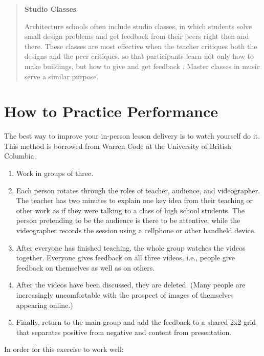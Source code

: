\begin{quote}\setlength{\parindent}{0pt}
\textbf{Studio Classes}

Architecture schools often include studio classes, in which students
solve small design problems and get feedback from their peers right
then and there. These classes are most effective when the teacher
critiques both the designs and the peer critiques, so that
participants learn not only how to make buildings, but how to give and
get feedback \cite{Scho1984}. Master classes in music serve a
similar purpose.
\end{quote}

\section{How to Practice Performance}\label{s:performance-practice}

The best way to improve your in-person lesson delivery is to watch
yourself do it. This method is borrowed from Warren Code at the
University of British Columbia.

\begin{enumerate}
\item
  Work in groups of three.
\item
  Each person rotates through the roles of teacher, audience, and
  videographer. The teacher has two minutes to explain one key idea
  from their teaching or other work as if they were talking to a class
  of high school students. The person pretending to be the audience is
  there to be attentive, while the videographer records the session
  using a cellphone or other handheld device.
\item
  After everyone has finished teaching, the whole group watches the
  videos together. Everyone gives feedback on all three videos, i.e.,
  people give feedback on themselves as well as on others.
\item
  After the videos have been discussed, they are deleted. (Many people
  are increasingly uncomfortable with the prospect of images of
  themselves appearing online.)
\item
  Finally, return to the main group and add the feedback to a shared
  2x2 grid that separates positive from negative and content from
  presentation.
\end{enumerate}

In order for this exercise to work well:

